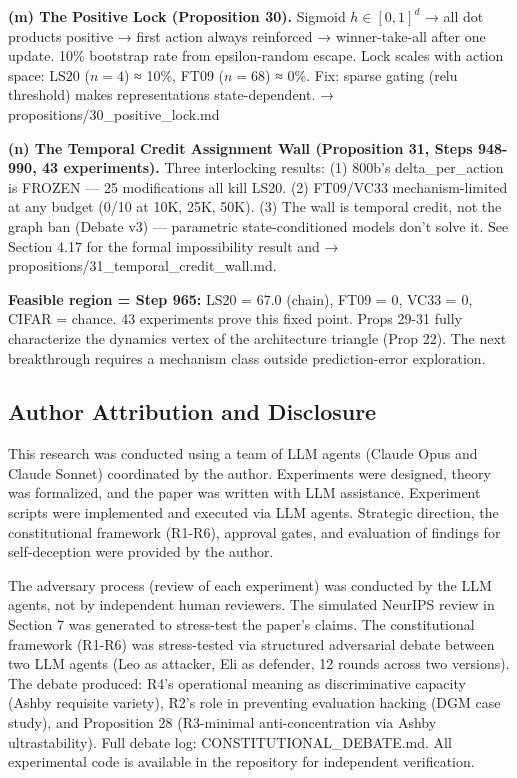 \documentclass[
  11pt,
]{article}
\begin{document}
\textbf{(m) The Positive Lock (Proposition 30).} Sigmoid
\(h \in [0,1]^d\) → all dot products positive → first action always
reinforced → winner-take-all after one update. 10\% bootstrap rate from
epsilon-random escape. Lock scales with action space: LS20 (\(n=4\)) ≈
10\%, FT09 (\(n=68\)) ≈ 0\%. Fix: sparse gating (relu threshold) makes
representations state-dependent. → propositions/30\_positive\_lock.md

\textbf{(n) The Temporal Credit Assignment Wall (Proposition 31, Steps
948-990, 43 experiments).} Three interlocking results: (1) 800b's
delta\_per\_action is FROZEN --- 25 modifications all kill LS20. (2)
FT09/VC33 mechanism-limited at any budget (0/10 at 10K, 25K, 50K). (3)
The wall is temporal credit, not the graph ban (Debate v3) ---
parametric state-conditioned models don't solve it. See Section 4.17 for
the formal impossibility result and →
propositions/31\_temporal\_credit\_wall.md.

\textbf{Feasible region = Step 965:} LS20 = 67.0 (chain), FT09 = 0, VC33
= 0, CIFAR = chance. 43 experiments prove this fixed point. Props 29-31
fully characterize the dynamics vertex of the architecture triangle
(Prop 22). The next breakthrough requires a mechanism class outside
prediction-error exploration.

\subsection{Author Attribution and
Disclosure}\label{author-attribution-and-disclosure}

This research was conducted using a team of LLM agents (Claude Opus and
Claude Sonnet) coordinated by the author. Experiments were designed,
theory was formalized, and the paper was written with LLM assistance.
Experiment scripts were implemented and executed via LLM agents.
Strategic direction, the constitutional framework (R1-R6), approval
gates, and evaluation of findings for self-deception were provided by
the author.

The adversary process (review of each experiment) was conducted by the
LLM agents, not by independent human reviewers. The simulated NeurIPS
review in Section 7 was generated to stress-test the paper's claims. The
constitutional framework (R1-R6) was stress-tested via structured
adversarial debate between two LLM agents (Leo as attacker, Eli as
defender, 12 rounds across two versions). The debate produced: R4's
operational meaning as discriminative capacity (Ashby requisite
variety), R2's role in preventing evaluation hacking (DGM case study),
and Proposition 28 (R3-minimal anti-concentration via Ashby
ultrastability). Full debate log: CONSTITUTIONAL\_DEBATE.md. All
experimental code is available in the repository for independent
verification.
\end{document}
